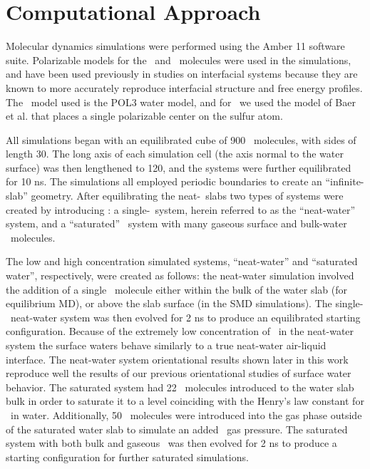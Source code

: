 \section{Computational Approach}

Molecular dynamics simulations were performed using the Amber 11 software suite.\cite{Case2010} Polarizable models for the \wat~and \suldiox~molecules were used in the simulations, and have been used previously in studies on interfacial systems because they are known to more accurately reproduce interfacial structure and free energy profiles.\cite{Wick2007,Rivera2006,Dang1998} The \wat~model used is the POL3 water model,\cite{Caldwell1995} and for \suldiox~we used the model of Baer et al. that places a single polarizable center on the sulfur atom.\cite{Baer2010}

All simulations began with an equilibrated cube of 900 \wat~molecules, with sides of length 30\angs. The long axis of each simulation cell (the axis normal to the water surface) was then lengthened to 120\angs, and the systems were further equilibrated for 10 ns. The simulations all employed periodic boundaries to create an ``infinite-slab'' geometry. After equilibrating the neat-\wat~slabs two types of systems were created by introducing \suldiox: a single-\suldiox~system, herein referred to as the ``neat-water'' system, and a ``saturated'' \suldiox~system with many gaseous surface and bulk-water \suldiox~molecules.

The low and high concentration simulated systems, ``neat-water'' and ``saturated water'', respectively, were created as follows: the neat-water simulation involved the addition of a single \suldiox~molecule either within the bulk of the water slab (for equilibrium MD), or above the slab surface (in the SMD simulations). The single-\suldiox~neat-water system was then evolved for 2 ns to produce an equilibrated starting configuration. Because of the extremely low concentration of \suldiox~in the neat-water system the surface waters behave similarly to a true neat-water air-liquid interface. The neat-water system orientational results shown later in this work reproduce well the results of our previous orientational studies of surface water behavior.\cite{Walker2006b,Hore2008} The saturated system had 22 \suldiox~molecules introduced to the water slab bulk in order to saturate it to a level coinciding with the Henry's law constant for \suldiox~in water. Additionally, 50 \suldiox~molecules were introduced into the gas phase outside of the saturated water slab to simulate an added \suldiox~gas pressure. The saturated system with both bulk and gaseous \suldiox~was then evolved for 2 ns to produce a starting configuration for further saturated simulations.


